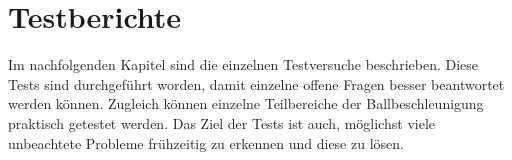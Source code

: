 \section{Testberichte}
Im nachfolgenden Kapitel sind die einzelnen Testversuche beschrieben. 
Diese Tests sind durchgeführt worden, damit einzelne offene Fragen 
besser beantwortet werden können. Zugleich können einzelne Teilbereiche 
der Ballbeschleunigung praktisch getestet werden. Das Ziel der Tests ist 
auch, möglichst viele unbeachtete Probleme frühzeitig zu erkennen und 
diese zu lösen. 